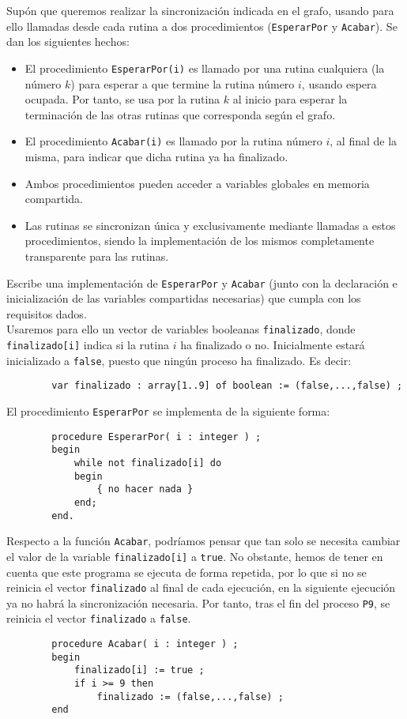 \begin{ejercicio}
    Supón que queremos realizar la sincronización indicada en el grafo, usando para ello llamadas
    desde cada rutina a dos procedimientos (\verb|EsperarPor| y \verb|Acabar|). Se dan los siguientes hechos:
    \begin{itemize}
        \item El procedimiento \verb|EsperarPor(i)| es llamado por una rutina cualquiera (la número $k$) para esperar a que termine la rutina número $i$, usando espera ocupada. Por tanto, se usa por la rutina $k$ al inicio para esperar la terminación de las otras rutinas que corresponda según el grafo.
        \item El procedimiento \verb|Acabar(i)| es llamado por la rutina número $i$, al final de la misma, para indicar que dicha rutina ya ha finalizado.
        \item Ambos procedimientos pueden acceder a variables globales en memoria compartida.
        \item Las rutinas se sincronizan única y exclusivamente mediante llamadas a estos procedimientos, siendo la implementación de los mismos completamente transparente para las rutinas.
    \end{itemize}
    Escribe una implementación de \verb|EsperarPor| y \verb|Acabar| (junto con la declaración e inicialización de las variables compartidas necesarias) que cumpla con los requisitos dados.\\

    Usaremos para ello un vector de variables booleanas \verb|finalizado|, donde \verb|finalizado[i]| indica si la rutina $i$ ha finalizado o no. Inicialmente estará inicializado a \verb|false|, puesto que ningún proceso ha finalizado. Es decir:
    \begin{verbatim}
        var finalizado : array[1..9] of boolean := (false,...,false) ;
    \end{verbatim}

    El procedimiento \verb|EsperarPor| se implementa de la siguiente forma:
    \begin{verbatim}
        procedure EsperarPor( i : integer ) ;
        begin
            while not finalizado[i] do
            begin
                { no hacer nada }
            end;
        end.
    \end{verbatim}

    Respecto a la función \verb|Acabar|, podríamos pensar que tan solo se necesita cambiar el valor de la variable \verb|finalizado[i]| a \verb|true|. No obstante, hemos de tener en cuenta que este programa se ejecuta de forma repetida, por lo que si no se reinicia el vector \verb|finalizado| al final de cada ejecución, en la siguiente ejecución ya no habrá la sincronización necesaria. Por tanto, tras el fin del proceso \verb|P9|, se reinicia el vector \verb|finalizado| a \verb|false|.
    \begin{verbatim}
        procedure Acabar( i : integer ) ;
        begin
            finalizado[i] := true ;
            if i >= 9 then
                finalizado := (false,...,false) ;
        end
    \end{verbatim}
    
\end{ejercicio}


